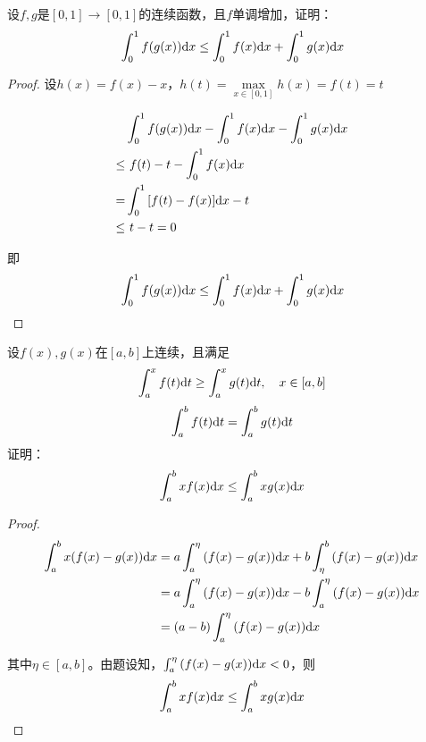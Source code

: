 \begin{proposition}

    设$f,g$是$[0,1] \to [0,1]$的连续函数，且$f$单调增加，证明：
    $$\int_{0}^{1}{f(g(x))}\mathrm{d} x \leq \int_{0}^{1}{f(x)}\mathrm{d} x + \int_{0}^{1}{g(x)}\mathrm{d} x$$

\end{proposition}

\begin{proof}

    设$h(x) = f(x) - x$，$h(t) = \max\limits_{x \in [0,1]}{h(x)} = f(t) = t$

    \begin{align*}
        & \int_{0}^{1}{f(g(x))}\mathrm{d} x - \int_{0}^{1}{f(x)}\mathrm{d} x - \int_{0}^{1}{g(x)}\mathrm{d} x \\
        \leq & \ f(t) - t - \int_{0}^{1}{f(x)}\mathrm{d} x \\
        = & \int_{0}^{1}{[f(t) - f(x)]}\mathrm{d} x - t \\
        \leq & \ t -t = 0
    \end{align*}

    即
    $$\int_{0}^{1}{f(g(x))}\mathrm{d} x \leq \int_{0}^{1}{f(x)}\mathrm{d} x + \int_{0}^{1}{g(x)}\mathrm{d} x$$

\end{proof}

\begin{proposition}

    设$f(x),g(x)$在$[a,b]$上连续，且满足
    $$\int_{a}^{x}{f(t)}\mathrm{d} t \geq \int_{a}^{x}{g(t)}\mathrm{d} t, \quad x \in [a,b]$$
    $$\int_{a}^{b}{f(t)}\mathrm{d} t = \int_{a}^{b}{g(t)}\mathrm{d} t$$
    证明：
    $$\int_{a}^{b}{xf(x)}\mathrm{d} x \leq \int_{a}^{b}{xg(x)}\mathrm{d} x$$

\end{proposition}

\begin{proof}

    \begin{align*}
        \int_{a}^{b}{x(f(x) - g(x))}\mathrm{d} x & = a \int_{a}^{\eta}{(f(x) - g(x))}\mathrm{d} x + b\int_{\eta}^{b}{(f(x) - g(x))}\mathrm{d} x \\
        & = a \int_{a}^{\eta}{(f(x) - g(x))}\mathrm{d} x - b\int_{a}^{\eta}{(f(x) - g(x))}\mathrm{d} x \\
        & = (a - b) \int_{a}^{\eta}{(f(x) - g(x))}\mathrm{d} x
    \end{align*}

    其中$\eta \in [a,b]$。由题设知，$\int_{a}^{\eta}{(f(x) - g(x))}\mathrm{d} x < 0$，则
    $$\int_{a}^{b}{xf(x)}\mathrm{d} x \leq \int_{a}^{b}{xg(x)}\mathrm{d} x$$

\end{proof}

